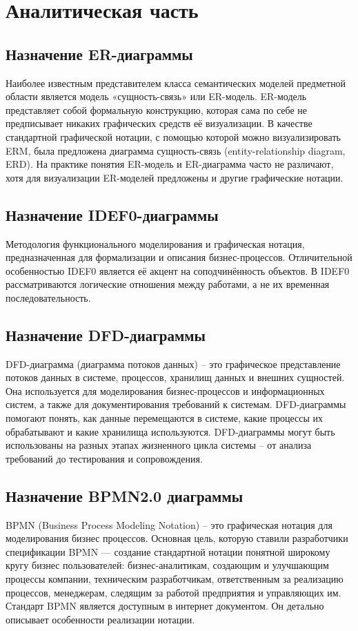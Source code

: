 \documentclass[12pt]{report}
\begin{document}
\chapter{Аналитическая часть}

\section{Назначение ER-диаграммы}
Наиболее известным представителем класса семантических моделей предметной области является модель «сущность-связь» или ER-модель. 
ER-модель представляет собой формальную конструкцию, которая сама по себе не предписывает никаких графических средств её визуализации.
В качестве стандартной графической нотации, с помощью которой можно визуализировать ERM, была предложена диаграмма сущность-связь (entity-relationship diagram,
ERD). 
На практике понятия ER-модель и ER-диаграмма часто не различают, хотя для визуализации ER-моделей предложены и другие графические нотации. 

\section{Назначение IDEF0-диаграммы}
Методология функционального моделирования и графическая нотация, предназначенная для формализации и описания бизнес-процессов.
Отличительной особенностью IDEF0 является её акцент на соподчинённость объектов. 
В IDEF0 рассматриваются логические отношения между работами, а не их временная последовательность. 

\section{Назначение DFD-диаграммы}
DFD-диаграмма (диаграмма потоков данных) -- это графическое представление потоков данных в системе, процессов, хранилищ данных и внешних сущностей. 
Она используется для моделирования бизнес-процессов и информационных систем, а также для документирования требований к системам. 
DFD-диаграммы помогают понять, как данные перемещаются в системе, какие процессы их обрабатывают и какие хранилища используются. 
DFD-диаграммы могут быть использованы на разных этапах жизненного цикла системы -- от анализа требований до тестирования и сопровождения.

\section{Назначение BPMN2.0 диаграммы}
BPMN (Business Process Modeling Notation) -- это графическая нотация для моделирования бизнес процессов. 
Основная цель, которую ставили разработчики спецификации BPMN — создание стандартной нотации понятной широкому кругу бизнес пользователей: бизнес-аналитикам, создающим и улучшающим процессы компании, техническим разработчикам, ответственным за реализацию процессов, менеджерам, следящим за работой предприятия и управляющих им.
Стандарт BPMN является доступным в интернет документом. Он детально описывает особенности реализации нотации.
\end{document}
